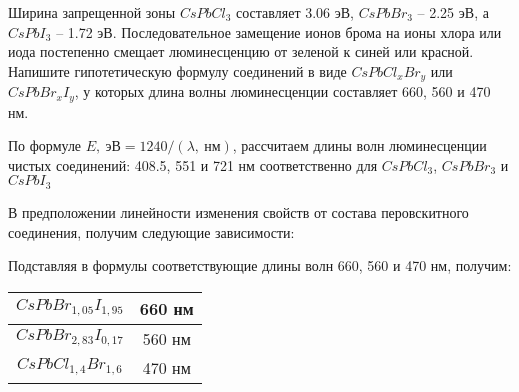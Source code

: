 
Ширина запрещенной зоны $CsPbCl_3$ составляет 3.06 эВ, $CsPbBr_3$ – 2.25 эВ, а $CsPbI_3$ – 1.72 эВ. Последовательное замещение ионов брома на ионы хлора или иода постепенно смещает люминесценцию от зеленой к синей или красной. Напишите гипотетическую формулу соединений в виде $CsPbCl_xBr_y$ или $CsPbBr_xI_y$, у которых длина волны люминесценции составляет 660, 560 и 470 нм.

По формуле $E, \: \text{эВ} = 1240/(\lambda, \: \text{нм})$, рассчитаем длины волн люминесценции чистых соединений: 408.5, 551 и 721 нм соответственно для $CsPbCl_3$, $CsPbBr_3$ и $CsPbI_3$

В предположении линейности изменения свойств от состава перовскитного соединения, получим следующие зависимости:


Подставляя в формулы соответствующие длины волн 660, 560 и 470 нм, получим:

\begin{table}[H]
    \begin{center}
        \begin{tabular}{|c|c|}
            \hline
            $CsPbBr_{1,05}I_{1,95}$& 	660 нм \\
            \hline
            $CsPbBr_{2,83}I_{0,17}$& 	560 нм \\
            \hline
            $CsPbCl_{1,4}Br_{1,6}$& 	470 нм \\
            \hline
        \end{tabular}
    \end{center}
\end{table}